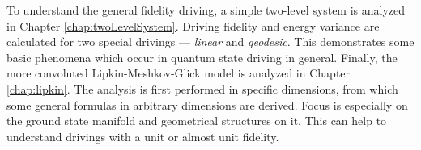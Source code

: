 To understand the general fidelity driving, a simple two-level system is analyzed in Chapter \ref{chap:twoLevelSystem}. Driving fidelity and energy variance are calculated for two special drivings — \emph{linear} and \emph{geodesic}. This demonstrates some basic phenomena which occur in quantum state driving in general. Finally, the more convoluted Lipkin-Meshkov-Glick model is analyzed in Chapter \ref{chap:lipkin}. The analysis is first performed in specific dimensions, from which some general formulas in arbitrary dimensions are derived. Focus is especially on the ground state manifold and geometrical structures on it. This can help to understand drivings with a unit or almost unit fidelity.
